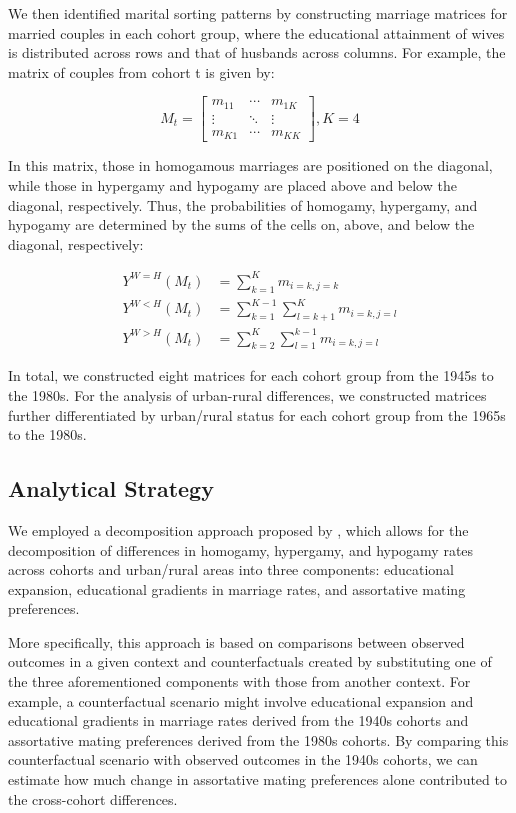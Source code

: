 We then identified marital sorting patterns by constructing marriage matrices for married couples in each cohort group, where the educational attainment of wives is distributed across rows and that of husbands across columns. For example, the matrix of couples from cohort t is given by:

\begin{equation}
    M_t = \begin{bmatrix}
        m_{11} & \cdots & m_{1K} \\
        \vdots & \ddots & \vdots \\
        m_{K1} & \cdots & m_{KK}
    \end{bmatrix}, K = 4
\end{equation}

In this matrix, those in homogamous marriages are positioned on the diagonal, while those in hypergamy and hypogamy are placed above and below the diagonal, respectively. Thus, the probabilities of homogamy, hypergamy, and hypogamy are determined by the sums of the cells on, above, and below the diagonal, respectively:

\begin{align}
    Y^{W=H}(M_t) & = \sum_{k=1}^K m_{i=k,j=k}                    \\[10pt]
    Y^{W<H}(M_t) & = \sum_{k=1}^{K-1} \sum_{l=k+1}^K m_{i=k,j=l} \\[10pt]
    Y^{W>H}(M_t) & = \sum_{k=2}^K \sum_{l=1}^{k-1} m_{i=k,j=l}
\end{align}

In total, we constructed eight matrices for each cohort group from the 1945s to the 1980s. For the analysis of urban-rural differences, we constructed matrices further differentiated by urban/rural status for each cohort group from the 1965s to the 1980s.

\subsection{Analytical Strategy}

We employed a decomposition approach proposed by \textcite{leeschDecomposingTrendsEducational2023}, which allows for the decomposition of differences in homogamy, hypergamy, and hypogamy rates across cohorts and urban/rural areas into three components: educational expansion, educational gradients in marriage rates, and assortative mating preferences.

More specifically, this approach is based on comparisons between observed outcomes in a given context and counterfactuals created by substituting one of the three aforementioned components with those from another context. For example, a counterfactual scenario might involve educational expansion and educational gradients in marriage rates derived from the 1940s cohorts and assortative mating preferences derived from the 1980s cohorts. By comparing this counterfactual scenario with observed outcomes in the 1940s cohorts, we can estimate how much change in assortative mating preferences alone contributed to the cross-cohort differences.

